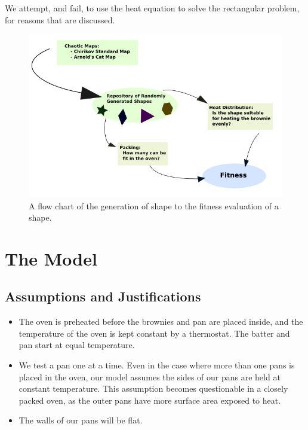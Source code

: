 \documentclass[12pt]{reedmcm}
\begin{document}
We attempt, and fail, to use the heat equation to solve the rectangular problem, for reasons that are discussed.
\begin{figure}[t]
  \centering
  \includegraphics[width=1.0\textwidth]{fitness_flowchart}
  \caption{A flow chart of the generation of shape to the fitness evaluation of a shape.}
  \label{fig:fitnessflow}
\end{figure}

\section{The Model}
\subsection{Assumptions and Justifications}
\begin{itemize}
  \item The oven is preheated before the brownies and pan are placed inside, and the temperature of the oven is kept constant by a thermostat. The batter and pan start at equal temperature.

  \item We test a pan one at a time. 
  Even in the case where more than one pans is placed in the oven, our model assumes the sides of our pans are held at constant temperature.  This assumption becomes questionable in a closely packed oven, as the outer pans have more surface area exposed to heat.

  \item The walls of our pans will be flat.
\end{itemize}
\end{document}
